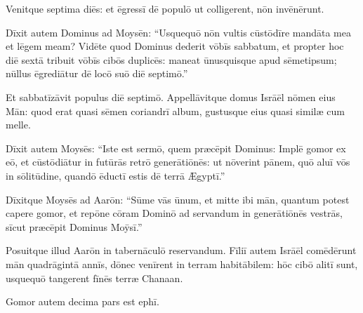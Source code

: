 Venitque septima diēs: et ēgressī dē populō ut
colligerent, nōn invēnērunt.

Dīxit autem Dominus ad
Moysēn: ``Us\-quequō nōn vultis
cūstōdīre mandāta mea et lēgem meam? Vidēte quod Dominus dederit vōbīs
sabbatum, et propter hoc diē sextā tribuit vōbīs cibōs
duplicēs: maneat ūnusquisque apud sēmetipsum; nūllus
ēgrediātur dē locō suō diē septimō.''

Et sabbatīzāvit
populus diē septimō. \linebreak{}Appellāvitque domus Isrāēl nōmen eius Mān: quod erat quasi sēmen
coriandrī album, gustusque eius quasi
similæ cum melle.

Dīxit autem Moysēs: ``Iste est sermō, quem præcēpit
Dominus: Implē gomor ex eō, et cūstōdiātur in futūrās
retrō generātiōnēs: ut nōverint pānem, quō aluī vōs in sōlitūdine, quandō
ēductī estis dē terrā Ægyptī.''

Dīxitque Moysēs ad Aarōn: ``Sūme vās ūnum,
et mitte ibi mān, quantum potest capere gomor, et repōne cōram Dominō ad
servandum in generātiōnēs vestrās, sīcut præcēpit Dominus Moȳsī.''

Posuitque illud Aarōn in tabernāculō reservandum. Fīliī autem Isrāēl
comēdērunt mān quadrāgintā annīs, dōnec venīrent in terram habitābilem: hōc cibō alitī sunt, usquequō
tangerent fīnēs terræ Chanaan.

Gomor autem decima pars
est ephī.
